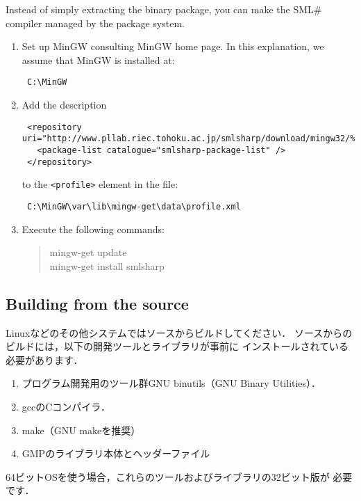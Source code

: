 \documentclass{jbook}
\newcommand{\txt}[2]{#2}
\newcommand{\smlsharp}{SML\#}
\newenvironment{program}{\begin{tt}\begin{quote}}{\end{quote}\end{tt}}
\begin{document}
	Instead of simply extracting the binary package, you can make
the \smlsharp{} compiler managed by the package system.
% 
\begin{enumerate}
\item Set up MinGW consulting MinGW home page.
	In this explanation, we assume that MinGW is installed at:
\begin{verbatim}
 C:\MinGW
\end{verbatim}

\item 
Add the description
\begin{verbatim}
 <repository uri="http://www.pllab.riec.tohoku.ac.jp/smlsharp/download/mingw32/%F.xml.lzma">
   <package-list catalogue="smlsharp-package-list" />
 </repository>
\end{verbatim}
to the {\tt <profile>} element in the file:
\begin{verbatim}
 C:\MinGW\var\lib\mingw-get\data\profile.xml
\end{verbatim}

\item Execute the following commands:
\begin{program}
mingw-get update\\
mingw-get install smlsharp
\end{program}
\end{enumerate} 
\fi%

\subsection{\txt{ソースからビルドする場合}{Building from the source}}
\ifx\jp%
	Linuxなどのその他システムではソースからビルドしてください．
	ソースからのビルドには，以下の開発ツールとライブラリが事前に
インストールされている必要があります．
\begin{enumerate}
\item プログラム開発用のツール群GNU binutils（GNU Binary Utilities）．
\item gccのCコンパイラ．
\item make（GNU makeを推奨）
\item GMPのライブラリ本体とヘッダーファイル
\end{enumerate}
	64ビットOSを使う場合，これらのツールおよびライブラリの32ビット版が
必要です．
\end{document}
